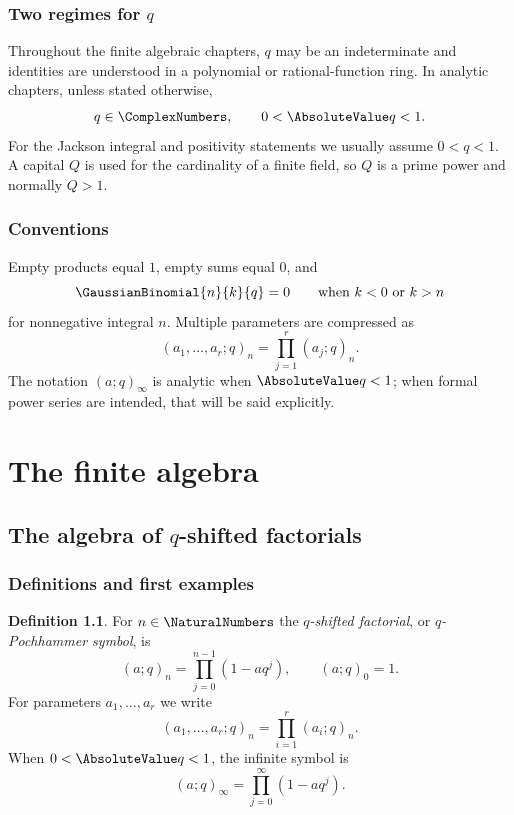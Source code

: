 \documentclass[11pt,a4paper,oneside,openany]{book}
\theoremstyle{definition}
\newtheorem{definition}[definition]{Definition}
\theoremstyle{remark}
\begin{document}
\section*{Two regimes for $q$}
Throughout the finite algebraic chapters, $q$ may be an indeterminate and identities are understood in a polynomial or rational-function ring.  In analytic chapters, unless stated otherwise,
\[
  q\in\ComplexNumbers,\qquad 0<\AbsoluteValue q<1.
\]
For the Jackson integral and positivity statements we usually assume $0<q<1$.  A capital $Q$ is used for the cardinality of a finite field, so $Q$ is a prime power and normally $Q>1$.

\section*{Conventions}
Empty products equal $1$, empty sums equal $0$, and
\[
 \GaussianBinomial{n}{k}{q}=0\qquad\text{when }k<0\text{ or }k>n
\]
for nonnegative integral $n$.  Multiple parameters are compressed as
\[
 (a_1,\ldots,a_r;q)_n=\prod_{j=1}^r(a_j;q)_n.
\]
The notation $(a;q)_\infty$ is analytic when $\AbsoluteValue q<1$; when formal power series are intended, that will be said explicitly.

\tableofcontents

\mainmatter

\part{The finite algebra}

\chapter{The algebra of \texorpdfstring{$q$}{q}-shifted factorials}\label{chap:pochhammer}

\section{Definitions and first examples}

\begin{definition}
For $n\in\NaturalNumbers$ the \emph{$q$-shifted factorial}, or \emph{$q$-Pochhammer symbol}, is
\[
 (a;q)_n=\prod_{j=0}^{n-1}(1-aq^j),\qquad (a;q)_0=1.
\]
For parameters $a_1,\dots,a_r$ we write
\[
 (a_1,\dots,a_r;q)_n=\prod_{i=1}^r(a_i;q)_n.
\]
When $0<\AbsoluteValue q<1$, the infinite symbol is
\[
 (a;q)_\infty=\prod_{j=0}^{\infty}(1-aq^j).
\]
\end{definition}
\end{document}
